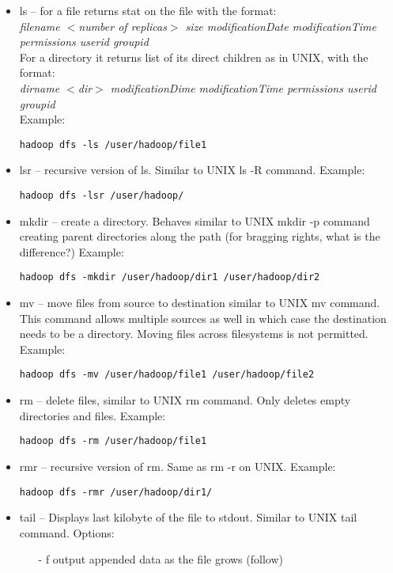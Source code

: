\documentclass[12pt,a4paper]{article}
\begin{document}
\begin{itemize}
\item ls – for a file returns stat on the file with the format:\\
\emph{filename $<$number of replicas$>$ size modificationDate modificationTime permissions userid groupid\\}
For a directory it returns list of its direct children as in UNIX, with the format:\\
\emph{dirname $<$dir$>$ modificationDime modificationTime permissions userid groupid}\\
Example:
\begin{verbatim}
hadoop dfs -ls /user/hadoop/file1
\end{verbatim}

\item lsr – recursive version of ls. Similar to UNIX ls -R command.
Example:
\begin{verbatim}
hadoop dfs -lsr /user/hadoop/
\end{verbatim}

\item mkdir – create a directory. Behaves similar to UNIX mkdir -p command creating parent directories
along the path (for bragging rights, what is the difference?)
Example:
\begin{verbatim}
hadoop dfs -mkdir /user/hadoop/dir1 /user/hadoop/dir2
\end{verbatim}

\item mv – move files from source to destination similar to UNIX mv command. This command allows
multiple sources as well in which case the destination needs to be a directory. Moving files
across filesystems is not permitted.
Example:
\begin{verbatim}
hadoop dfs -mv /user/hadoop/file1 /user/hadoop/file2
\end{verbatim}

\item rm – delete files, similar to UNIX rm command. Only deletes empty directories and files.
Example:
\begin{verbatim}
hadoop dfs -rm /user/hadoop/file1
\end{verbatim}

\item rmr – recursive version of rm. Same as rm -r on UNIX.
Example:
\begin{verbatim}
hadoop dfs -rmr /user/hadoop/dir1/
\end{verbatim}

\item tail – Displays last kilobyte of the file to stdout. Similar to UNIX tail command. Options:\begin{itemize}
\item[-] f output appended data as the file grows (follow)
\end{itemize}


\end{itemize}
\end{document}
